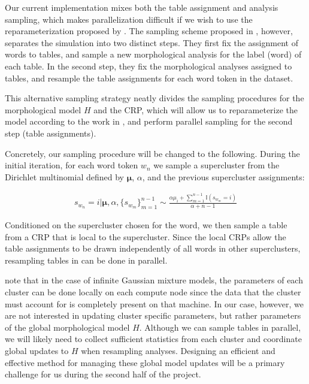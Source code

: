 \documentclass{article}
\begin{document}
Our current implementation mixes both the table assignment and
analysis sampling, which makes parallelization difficult if we wish to
use the reparameterization proposed by \cite{lovell2012}. The sampling
scheme proposed in \cite{goldwater2011}, however, separates the
simulation into two distinct steps. They first fix the assignment of
words to tables, and sample a new morphological analysis for the label
(word) of each table. In the second step, they fix the morphological
analyses assigned to tables, and resample the table assignments for
each word token in the dataset.

This alternative sampling strategy neatly divides the sampling
procedures for the morphological model $H$ and the CRP, which will
allow us to reparameterize the model according to the work in
\cite{lovell2012}, and perform parallel sampling for the second step
(table assignments).

Concretely, our sampling procedure will be changed to the
following. During the initial iteration, for each word token $w_n$ we
sample a supercluster from the Dirichlet multinomial defined by
$\boldsymbol{\mu}$, $\alpha$, and the previous supercluster
assignments:

\begin{align}
  s_{w_n} = i | \boldsymbol{\mu}, \alpha, \{s_{w_m}\}_{m=1}^{n-1} \sim
  \frac{\alpha \mu_i + \sum_{m=1}^{n-1} \mathbb{I}(s_{w_m} = i)}{\alpha + n - 1}
\end{align}

Conditioned on the supercluster chosen for the word, we then sample a
table from a CRP that is local to the supercluster. Since the local
CRPs allow the table assignments to be drawn independently of all
words in other superclusters, resampling tables in can be done in
parallel.

\cite{lovell2012} note that in the case of infinite Gaussian mixture
models, the parameters of each cluster can be done locally on each
compute node since the data that the cluster must account for is
completely present on that machine. In our case, however, we are not
interested in updating cluster specific parameters, but rather
parameters of the global morphological model $H$. Although we can
sample tables in parallel, we will likely need to collect sufficient
statistics from each cluster and coordinate global updates to $H$ when
resampling analyses. Designing an efficient and effective method for
managing these global model updates will be a primary challenge for us
during the second half of the project.
\end{document}
